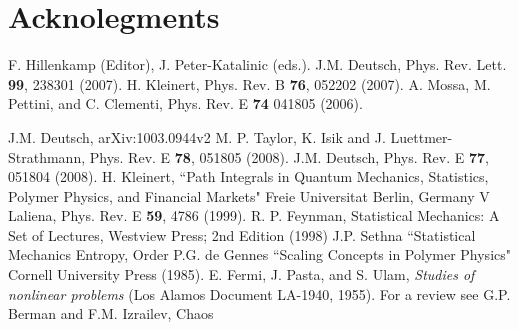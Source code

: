 \documentclass[11pt]{ucthesis}
\begin{document}
\part{Acknolegments}

\begin{thebibliography}{}
 F. Hillenkamp (Editor), J. Peter-Katalinic (eds.). 
 J.M. Deutsch, Phys. Rev. Lett. {\bf 99}, 238301 (2007).
 H. Kleinert, Phys. Rev. B {\bf76}, 052202 (2007). 
 A. Mossa, M. Pettini, and C. Clementi, Phys. Rev. E {\bf 74} 041805 (2006).

 J.M. Deutsch, arXiv:1003.0944v2 
 M. P. Taylor, K. Isik and J. Luettmer-Strathmann,  Phys. Rev. E {\bf 78}, 051805  (2008).
 J.M. Deutsch, Phys. Rev. E {\bf 77}, 051804 (2008).
 H. Kleinert, ``Path Integrals in Quantum Mechanics, Statistics, Polymer Physics, and Financial Markets" Freie Universitat Berlin, Germany
 V Laliena, Phys. Rev. E {\bf 59}, 4786 (1999).
 R. P. Feynman, Statistical Mechanics: A Set of Lectures, Westview Press; 2nd Edition (1998)
 J.P. Sethna ``Statistical Mechanics Entropy, Order
 P.G. de Gennes ``Scaling Concepts in Polymer Physics" Cornell University Press (1985).
 E. Fermi, J. Pasta, and S. Ulam, {\em Studies of nonlinear problems} 
(Los Alamos Document LA-1940, 1955).
 For a review see G.P. Berman and F.M. Izrailev, Chaos





\end{thebibliography}
\end{document}
